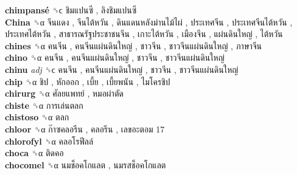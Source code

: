 \textbf{chimpansé} ␝ϲ   ชิมแปนซี ,  ลิงชิมแปนซี   \\
\textbf{China} ␝α   จีนแดง ,  จีนไต้หวัน ,  ดินแดนหลังม่านไม้ไผ่ ,  ประเทศจีน ,  ประเทศจีนไต้หวัน ,  ประเทศไต้หวัน ,  สาธารณรัฐประชาชนจีน ,  เกาะไต้หวัน ,  เมืองจีน ,  แผ่นดินใหญ่ ,  ไต้หวัน   \\
\textbf{chines} ␝α   คนจีน ,  คนจีนแผ่นดินใหญ่ ,  ชาวจีน ,  ชาวจีนแผ่นดินใหญ่ ,  ภาษาจีน   \\
\textbf{chino} ␝α   คนจีน ,  คนจีนแผ่นดินใหญ่ ,  ชาวจีน ,  ชาวจีนแผ่นดินใหญ่   \\
\textbf{chinu} \emph{adj}  ␝ϲ   คนจีน ,  คนจีนแผ่นดินใหญ่ ,  ชาวจีน ,  ชาวจีนแผ่นดินใหญ่   \\
\textbf{chip} ␝α   ชิป ,  หักออก ,  เบี้ย ,  เบี้ยพนัน ,  ไมโครชิป   \\
\textbf{chirurg} ␝α   ศัลยแพทย์ ,  หมอผ่าตัด   \\
\textbf{chiste} ␝α   การเล่นตลก   \\
\textbf{chistoso} ␝α   ตลก   \\
\textbf{chloor} ␝α   ก๊าซคลอรีน ,  คลอรีน ,  เลขอะตอม 17   \\
\textbf{chlorofyl} ␝α   คลอโรฟีลล์   \\
\textbf{choca} ␝α   ติดคอ   \\
\textbf{chocomel} ␝α   นมช็อคโกแลต ,  นมรสช็อคโกแลต   \\
